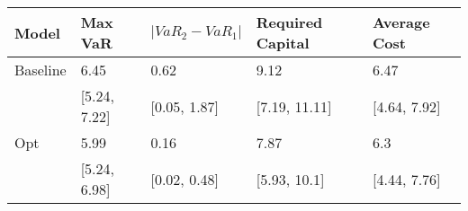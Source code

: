 \begin{tabular}{lllll}
\toprule
   Model &      Max VaR & $|VaR_2 - VaR_1|$ & Required Capital & Average Cost \\
\midrule
Baseline &         6.45 &              0.62 &             9.12 &         6.47 \\
         & [5.24, 7.22] &      [0.05, 1.87] &    [7.19, 11.11] & [4.64, 7.92] \\
     Opt &         5.99 &              0.16 &             7.87 &          6.3 \\
         & [5.24, 6.98] &      [0.02, 0.48] &     [5.93, 10.1] & [4.44, 7.76] \\
\bottomrule
\end{tabular}
